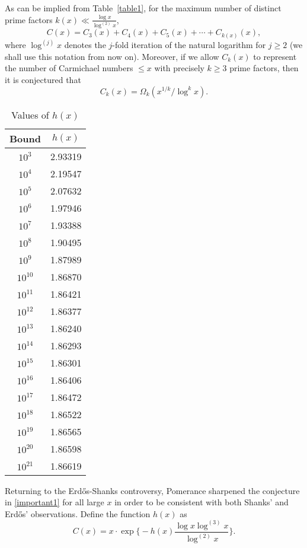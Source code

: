 \documentclass[11pt]{article}
\theoremstyle{plain}
\theoremstyle{definition}
\theoremstyle{remark}
\numberwithin{equation}{subsection}
\begin{document}
As can be implied from Table~\ref{table1}, for the maximum number of distinct prime factors $k(x) \ll \frac{\log x}{\log^{(2)} x}$,
\begin{equation} \label{important2}
C(x) = C_3(x) + C_4(x) + C_5(x) + \cdots + C_{k(x)}(x),
\end{equation}
where $\log^{(j)} x$ denotes the $j$-fold iteration of the natural logarithm for $j \ge 2$ (we shall use this notation from now on). Moreover, if we allow $C_k(x)$ to represent the number of Carmichael numbers $\le x$ with precisely $k \ge 3$ prime factors, then it is conjectured that
\begin{equation} \label{important3}
C_k(x) = \Omega_k(x^{1/k}/\log^k x).
\end{equation}
\begin{table}[t]
\caption{Values of $h(x)$}
\centering
\begin{tabular}{ || c | c || }
    \hline
\textbf{Bound} & \textbf{$h(x)$}\\ \hline
$10^{3}$ & 2.93319\\
$10^{4}$ & 2.19547\\
$10^{5}$ & 2.07632\\
$10^{6}$ & 1.97946\\
$10^{7}$ & 1.93388\\
$10^{8}$ & 1.90495\\
$10^{9}$ & 1.87989\\
$10^{10}$ & 1.86870\\
$10^{11}$ & 1.86421\\
$10^{12}$ & 1.86377\\
$10^{13}$ & 1.86240\\
$10^{14}$ & 1.86293\\
$10^{15}$ & 1.86301\\
$10^{16}$ & 1.86406\\
$10^{17}$ & 1.86472\\
$10^{18}$ & 1.86522\\
$10^{19}$ & 1.86565\\
$10^{20}$ & 1.86598\\
$10^{21}$ & 1.86619\\ \hline
\end{tabular}
\label{table2}
\end{table}
\indent Returning to the Erd\H{o}s-Shanks controversy, Pomerance \cite{8} sharpened the conjecture in \eqref{important1} for all large $x$ in order to be consistent with both Shanks' and Erd\H{o}s' observations. Define the function $h(x)$ as
\begin{equation} \label{700}
C(x) = x \cdot \exp\Big\{-h(x) \frac{\log x \log^{(3)} x}{\log^{(2)} x}\Bigr\}.
\end{equation}
\end{document}
